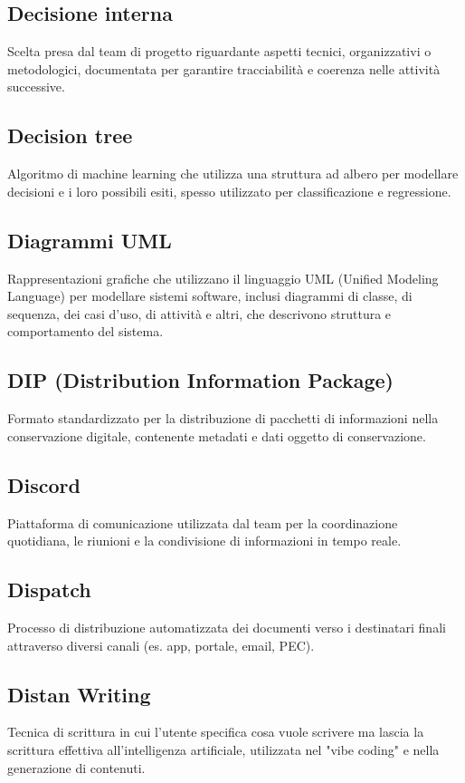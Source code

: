 \documentclass[a4paper,11pt]{article}
\begin{document}
\subsection{Decisione interna}
Scelta presa dal team di progetto riguardante aspetti tecnici, organizzativi o metodologici, documentata per garantire tracciabilità e coerenza nelle attività successive.

\subsection{Decision tree}
Algoritmo di machine learning che utilizza una struttura ad albero per modellare decisioni e i loro possibili esiti, spesso utilizzato per classificazione e regressione.

\subsection{Diagrammi UML}
Rappresentazioni grafiche che utilizzano il linguaggio UML (Unified Modeling Language) per modellare sistemi software, inclusi diagrammi di classe, di sequenza, dei casi d'uso, di attività e altri, che descrivono struttura e comportamento del sistema.

\subsection{DIP (Distribution Information Package)}
Formato standardizzato per la distribuzione di pacchetti di informazioni nella conservazione digitale, contenente metadati e dati oggetto di conservazione.

\subsection{Discord}
Piattaforma di comunicazione utilizzata dal team per la coordinazione quotidiana, le riunioni e la condivisione di informazioni in tempo reale.

\subsection{Dispatch}
Processo di distribuzione automatizzata dei documenti verso i destinatari finali attraverso diversi canali (es. app, portale, email, PEC).

\subsection{Distan Writing}
Tecnica di scrittura in cui l'utente specifica cosa vuole scrivere ma lascia la scrittura effettiva all'intelligenza artificiale, utilizzata nel "vibe coding" e nella generazione di contenuti.
\end{document}
